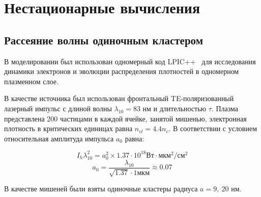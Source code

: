 \section{Нестационарные вычисления}

\subsection{Рассеяние волны одиночным кластером}

В моделировании был использован одномерный код LPIC++~\cite{Pfund1998} для исследования динамики электронов и эволюции распределения плотностей в одномерном плазменном слое.

В качестве источника был использован фронтальный TE-поляризованный лазерный импульс с длиной волны $\lambda_{10} = 83$ нм и длительностью $\tau$. Плазма представлена 200 частицами в каждой ячейке, занятой мишенью, электронная плотность в критических единицах равна $n_{el} = 4.4 n_c$. В соответствии с условием относительная амплитуда импульса $a_{0}$ равна:

    \begin{equation}
        I_h \lambda_{10}^2 = a_0^2 \times 1.37 \cdot 10^{18} \textrm{Вт}\cdot\textrm{мкм}^2/\textrm{см}^2
    \end{equation}
    \begin{equation*}
        a_0 = \frac{\lambda_{10}}{\sqrt{1.37} \cdot 1 \textrm{мкм}} \approx 0.07
    \end{equation*}




В качестве мишеней были взяты одиночные кластеры радиуса $a = 9,\:20$ нм.


